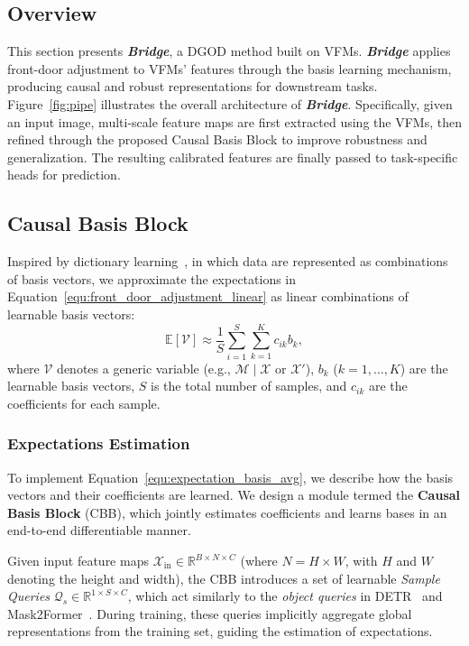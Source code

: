 \subsection{Overview}
This section presents \textbf{\textit{Bridge}}, a DGOD method built on VFMs. \textbf{\textit{Bridge}} applies front-door adjustment to VFMs' features through the basis learning mechanism, producing causal and robust representations for downstream tasks.
Figure~\ref{fig:pipe} illustrates the overall architecture of \textbf{\textit{Bridge}}. Specifically, given an input image, multi-scale feature maps are first extracted using the VFMs, then refined through the proposed Causal Basis Block to improve robustness and generalization.
The resulting calibrated features are finally passed to task-specific heads for prediction.
\subsection{Causal Basis Block}
Inspired by dictionary learning~\cite{tovsic2011dictionary}, in which data are represented as combinations of basis vectors, 
we approximate the expectations in Equation~\ref{equ:front_door_adjustment_linear} 
as linear combinations of learnable basis vectors:
\begin{equation}
    \mathbb{E}[\mathcal{V}] \approx \frac{1}{S} \sum_{i=1}^S \sum_{k=1}^K c_{ik} b_k,
    \label{equ:expectation_basis_avg}
\end{equation}
where $\mathcal{V}$ denotes a generic variable (e.g., $\mathcal{M}\mid\mathcal{X}$ or $\mathcal{X}'$), 
$b_k$ ($k=1,\dots,K$) are the learnable basis vectors, 
$S$ is the total number of samples, and $c_{ik}$ are the coefficients for each sample.

\subsubsection{Expectations Estimation} 
\label{sec:coefficients_estimation}
To implement Equation~\ref{equ:expectation_basis_avg}, we describe how the basis vectors and their coefficients are learned.
We design a module termed the \textbf{Causal Basis Block} (CBB), which jointly estimates coefficients and learns bases in an end-to-end differentiable manner.

Given input feature maps $\mathcal{X}_\mathrm{in} \in \mathbb{R}^{B \times N \times C}$ (where $N = H \times W$, with $H$ and $W$ denoting the height and width), the CBB introduces a set of learnable \textit{Sample Queries}
$\mathcal{Q}_s \in \mathbb{R}^{1 \times S \times C}$, which act similarly to the 
\textit{object queries} in DETR~\cite{carion2020end} and Mask2Former~\cite{cheng2022masked}.
During training, these queries implicitly aggregate global representations from the training set, guiding the estimation of expectations.

